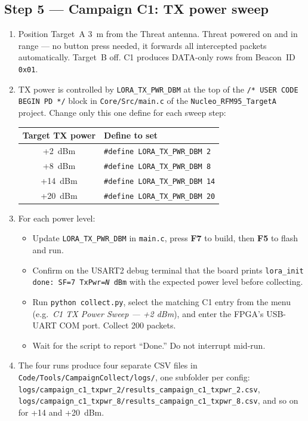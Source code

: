 \documentclass[11pt,letterpaper]{article}
\begin{document}
\newpage
\subsection{Step 5 --- Campaign C1: TX power sweep}
\begin{enumerate}[leftmargin=2em]
	\item Position Target~A 3~m from the Threat antenna. Threat powered on and in range --- no button press needed, it forwards all intercepted packets automatically. Target~B off. C1 produces DATA-only rows from Beacon~ID \texttt{0x01}.
	\item TX power is controlled by \texttt{LORA\_TX\_PWR\_DBM} at the top of the \texttt{/* USER CODE BEGIN PD */} block in \texttt{Core/Src/main.c} of the \texttt{Nucleo\_RFM95\_TargetA} project. Change only this one define for each sweep step:

	\begin{center}
	\renewcommand{\arraystretch}{1.2}
	\begin{tabular}{cl}
		\toprule
		\textbf{Target TX power} & \textbf{Define to set} \\
		\midrule
		+2~dBm  & \texttt{\#define LORA\_TX\_PWR\_DBM  2} \\
		+8~dBm  & \texttt{\#define LORA\_TX\_PWR\_DBM  8} \\
		+14~dBm & \texttt{\#define LORA\_TX\_PWR\_DBM  14} \\
		+20~dBm & \texttt{\#define LORA\_TX\_PWR\_DBM  20} \\
		\bottomrule
	\end{tabular}
	\end{center}

	\item For each power level:
	\begin{itemize}[leftmargin=1.2em]
		\item Update \texttt{LORA\_TX\_PWR\_DBM} in \texttt{main.c}, press \textbf{F7} to build, then \textbf{F5} to flash and run.
		\item Confirm on the USART2 debug terminal that the board prints \texttt{lora\_init done: SF=7 TxPwr=\textit{N} dBm} with the expected power level before collecting.
		\item Run \texttt{python collect.py}, select the matching C1 entry from the menu (e.g.\ \emph{C1 TX Power Sweep --- +2 dBm}), and enter the FPGA's USB-UART COM port. Collect 200 packets.
		\item Wait for the script to report ``Done.'' Do not interrupt mid-run.
	\end{itemize}
	\item The four runs produce four separate CSV files in \texttt{Code/Tools/CampaignCollect/logs/}, one subfolder per config: \texttt{logs/campaign\_c1\_txpwr\_2/results\_campaign\_c1\_txpwr\_2.csv}, \texttt{logs/campaign\_c1\_txpwr\_8/results\_campaign\_c1\_txpwr\_8.csv}, and so on for +14 and +20~dBm.
\end{enumerate}
\end{document}
